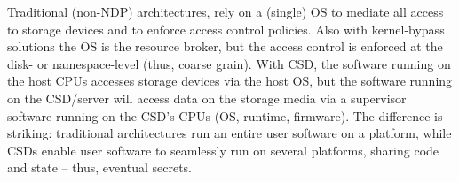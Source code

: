 
Traditional (non-NDP) architectures, rely on a (single) OS to mediate all access to storage devices and to enforce access control policies. Also with kernel-bypass solutions the OS is the resource broker, but the access control is enforced at the disk- or namespace-level (thus, coarse grain). %
With CSD, the software running on the host CPUs accesses storage devices via the host OS, but the software running on the CSD/server will access data on the storage media via a supervisor software running on the CSD's CPUs (OS, runtime, firmware).
The difference is striking: traditional architectures run an entire user software on a platform, while CSDs enable user software to seamlessly run on several platforms, sharing code and state -- thus, eventual secrets.

